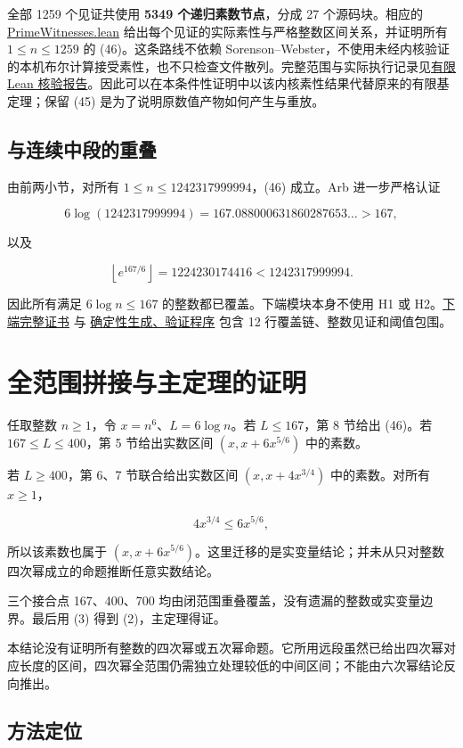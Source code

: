 \documentclass[UTF8,zihao=-4,fontset=fandol]{ctexart}
\begin{document}
全部 1259 个见证共使用 \textbf{5349 个递归素数节点}，分成 27 个源码块。相应的 \href{../lean/LegendreK6/PrimeWitnesses.lean}{PrimeWitnesses.lean} 给出每个见证的实际素性与严格整数区间关系，并证明所有 \(1\le n\le1259\) 的 (46)。这条路线不依赖 Sorenson–Webster，不使用未经内核验证的本机布尔计算接受素性，也不只检查文件散列。完整范围与实际执行记录见\href{../audit/FINITE_LEAN_REVIEW.md}{有限 Lean 核验报告}。因此可以在本条件性证明中以该内核素性结果代替原来的有限基定理；保留 (45) 是为了说明原数值产物如何产生与重放。

\subsection{与连续中段的重叠}

由前两小节，对所有 \(1\le n\le1242317999994\)，(46) 成立。Arb 进一步严格认证

\[
6\log(1242317999994)
=167.088000631860287653\ldots>167,
\]

以及

\[
\left\lfloor e^{167/6}\right\rfloor
=1224230174416<1242317999994. \tag{47}
\]

因此所有满足 \(6\log n\le167\) 的整数都已覆盖。下端模块本身不使用 H1 或 H2。\href{../results/lower_range_k6_certificate.json}{下端完整证书} 与 \href{../code/certify_lower_range_k6.py}{确定性生成、验证程序} 包含 12 行覆盖链、整数见证和阈值包围。

\section{全范围拼接与主定理的证明}

任取整数 \(n\ge1\)，令 \(x=n^6\)、\(L=6\log n\)。若 \(L\le167\)，第 8 节给出 (46)。若 \(167\le L\le400\)，第 5 节给出实数区间 \((x,x+6x^{5/6})\) 中的素数。

若 \(L\ge400\)，第 6、7 节联合给出实数区间 \((x,x+4x^{3/4})\) 中的素数。对所有 \(x\ge1\)，

\[
4x^{3/4}\le6x^{5/6},
\]

所以该素数也属于 \((x,x+6x^{5/6})\)。这里迁移的是实变量结论；并未从只对整数四次幂成立的命题推断任意实数结论。

三个接合点 167、400、700 均由闭范围重叠覆盖，没有遗漏的整数或实变量边界。最后用 (3) 得到 (2)，主定理得证。

本结论没有证明所有整数的四次幂或五次幂命题。它所用远段虽然已给出四次幂对应长度的区间，四次幂全范围仍需独立处理较低的中间区间；不能由六次幂结论反向推出。

\subsection{方法定位}
\end{document}
